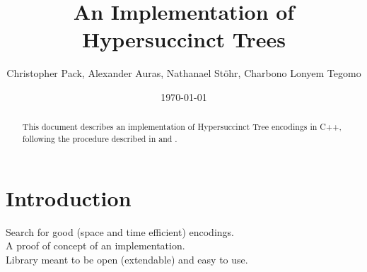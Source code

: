 \documentclass{article}
\begin{document}
\title{An Implementation of Hypersuccinct Trees}
\author{Christopher Pack, Alexander Auras, Nathanael Stöhr, Charbono Lonyem Tegomo}
\date{\today}
\maketitle

\begin{abstract}
This document describes an implementation of Hypersuccinct Tree encodings in C++, following the procedure described in \cite{farzanMunro} and \cite{universalSuccinct}.

\end{abstract}

\tableofcontents

\section{Introduction}
Search for good (space and time efficient) encodings.\\
A proof of concept of an implementation.\\
Library meant to be open (extendable) and easy to use.
\end{document}
